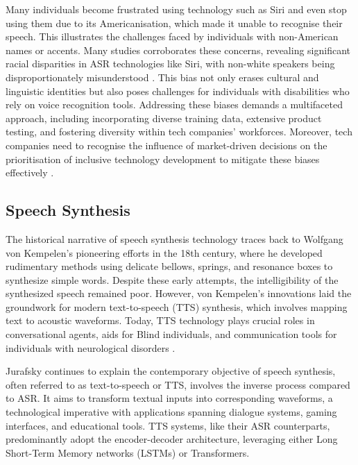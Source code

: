 \documentclass{l4proj}
\begin{document}
Many individuals become frustrated using technology such as Siri and even stop using them due to its Americanisation, which made it unable to recognise their speech. This illustrates the challenges faced by individuals with non-American names or accents. Many studies corroborates these concerns, revealing significant racial disparities in ASR technologies like Siri, with non-white speakers being disproportionately misunderstood \citep{koenecke2020racial}. This bias not only erases cultural and linguistic identities but also poses challenges for individuals with disabilities who rely on voice recognition tools. Addressing these biases demands a multifaceted approach, including incorporating diverse training data, extensive product testing, and fostering diversity within tech companies' workforces. Moreover, tech companies need to recognise the influence of market-driven decisions on the prioritisation of inclusive technology development to mitigate these biases effectively \citep{Lopez-Lloreda_2020}.

\subsection{Speech Synthesis}
\label{sec:speech-syn}

The historical narrative of speech synthesis technology traces back to Wolfgang von Kempelen's pioneering efforts in the 18th century, where he developed rudimentary methods using delicate bellows, springs, and resonance boxes to synthesize simple words. Despite these early attempts, the intelligibility of the synthesized speech remained poor. However, von Kempelen's innovations laid the groundwork for modern text-to-speech (TTS) synthesis, which involves mapping text to acoustic waveforms. Today, TTS technology plays crucial roles in conversational agents, aids for Blind individuals, and communication tools for individuals with neurological disorders \citep{jurafskyspeech, klatt1980software}.

Jurafsky continues to explain the contemporary objective of speech synthesis, often referred to as text-to-speech or TTS, involves the inverse process compared to ASR. It aims to transform textual inputs into corresponding waveforms, a technological imperative with applications spanning dialogue systems, gaming interfaces, and educational tools. TTS systems, like their ASR counterparts, predominantly adopt the encoder-decoder architecture, leveraging either Long Short-Term Memory networks (LSTMs) or Transformers.
\end{document}
